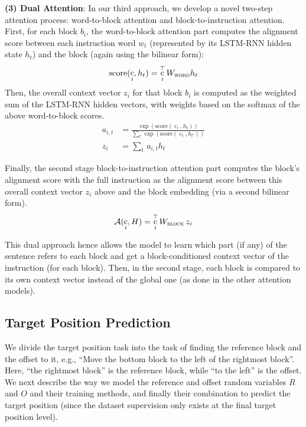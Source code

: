 \documentclass[letterpaper]{article} %
\DeclareMathOperator{\embb}{c}
\begin{document}
\textbf{(3) Dual Attention}:
In our third approach, we develop a novel two-step attention process: word-to-block attention and block-to-instruction attention.
First, for each block $b_i$, the word-to-block attention part computes the alignment score between each instruction word $w_t$ (represented by its LSTM-RNN hidden state $h_t$) and the block (again using the bilinear form):
\begin{equation}
\text{score}(\embb_i, h_t) = \embb_i^{\top} W_{\textsc{word}} h_t
\end{equation}
Then, the overall context vector $z_i$ for that block $b_i$ is computed as the weighted sum of the LSTM-RNN hidden vectors, with weights based on the softmax of the above word-to-block scores.
\begin{align}
a_{i,t} & = \frac{\exp \left( \text{score}(\embb_i, h_t) \right) }{\sum_{t'} \exp \left( \text{score}(\embb_i, h_{t'}) \right) } \\
z_i & = \sum_t\, a_{i,t} h_t
\end{align}

Finally, the second stage block-to-instruction attention part computes the block's alignment score with the full instruction as the alignment score between this overall context vector $z_i$ above and the block embedding (via a second bilinear form).
\begin{equation}
\mathcal{A}(\embb_i, H) = \embb_i^{\top} W_{\textsc{block}} \, z_i
\end{equation}

This dual approach hence allows the model to learn which part (if any) of the sentence refers to each block and get a block-conditioned context vector of the instruction (for each block). Then, in the second stage, each block is compared to its own context vector instead of the global one (as done in the other attention models).


\subsection{Target Position Prediction}

We divide the target position task into the task of finding the reference block and the offset to it, e.g., ``Move the bottom block to the left of the rightmost block''. Here, ``the rightmost block'' is the reference block, while ``to the left'' is the offset.
%
We next describe the way we model the reference and offset random variables $R$ and $O$ and their training methods, and finally their combination to predict the target position (since the dataset supervision only exists at the final target position level).
\end{document}
